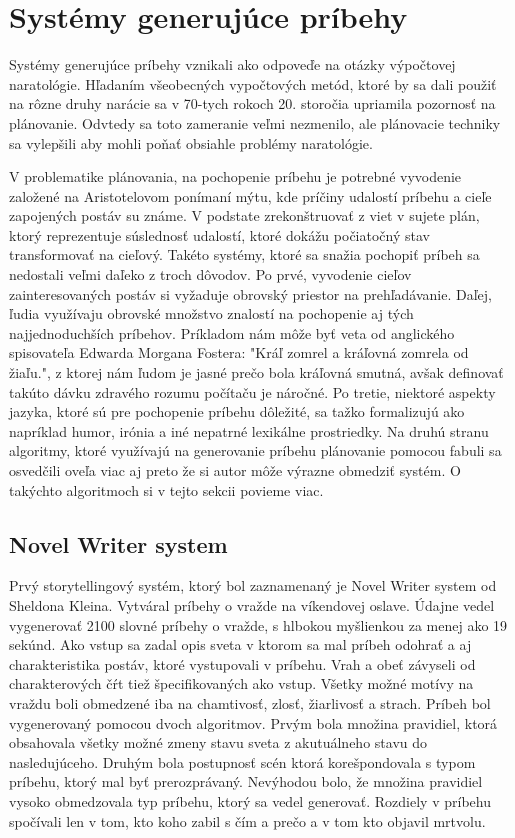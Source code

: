 \section{Systémy generujúce príbehy}
Systémy generujúce príbehy vznikali ako odpoveďe na otázky výpočtovej naratológie. Hľadaním všeobecných vypočtových metód, ktoré by sa dali použiť na rôzne druhy narácie sa v 70-tych rokoch 20. storočia upriamila pozornosť na plánovanie. Odvtedy sa toto zameranie veľmi nezmenilo, ale plánovacie techniky sa vylepšili aby mohli poňať obsiahle problémy naratológie.\par
V problematike plánovania, na pochopenie príbehu je potrebné vyvodenie založené na Aristotelovom ponímaní mýtu, kde príčiny udalostí príbehu a cieľe zapojených postáv su známe. V podstate zrekonštruovať z viet v sujete plán, ktorý reprezentuje súslednosť udalostí, ktoré dokážu počiatočný stav transformovať na cieľový. Takéto systémy, ktoré sa snažia pochopiť príbeh sa nedostali veľmi daľeko z troch dôvodov. Po prvé, vyvodenie cieľov zainteresovaných postáv si vyžaduje obrovský priestor na prehľadávanie. Daľej, ľudia využívaju obrovské množstvo znalostí na pochopenie aj tých najjednoduchších príbehov. Príkladom nám môže byť veta od anglického spisovateľa Edwarda Morgana Fostera: "Kráľ zomrel a kráľovná zomrela od žiaľu.", z ktorej nám ľudom je jasné prečo bola kráľovná smutná, avšak definovať takúto dávku zdravého rozumu počítaču je náročné. Po tretie, niektoré aspekty jazyka, ktoré sú pre pochopenie príbehu dôležité, sa tažko formalizujú ako napríklad humor, irónia a iné nepatrné lexikálne prostriedky. Na druhú stranu algoritmy, ktoré využívajú na generovanie príbehu plánovanie pomocou fabuli sa osvedčili oveľa viac aj preto že si autor môže výrazne obmedziť systém. O takýchto algoritmoch si v tejto sekcii povieme viac.\par
\subsection{Novel Writer system}
Prvý storytellingový systém, ktorý bol zaznamenaný je Novel Writer system\cite{novel_writer} od Sheldona Kleina. Vytváral príbehy o vražde na víkendovej oslave. Údajne vedel vygenerovať 2100 slovné príbehy o vražde, s hlbokou myšlienkou za menej ako 19 sekúnd. Ako vstup sa zadal opis sveta v ktorom sa mal príbeh odohrať a aj charakteristika postáv, ktoré vystupovali v príbehu. Vrah a obeť závyseli od charakterových čŕt tiež špecifikovaných ako vstup. Všetky možné motívy na vraždu boli obmedzené iba na chamtivosť, zlosť, žiarlivosť a strach. Príbeh bol vygenerovaný pomocou dvoch algoritmov. Prvým bola množina pravidiel, ktorá obsahovala všetky možné zmeny stavu sveta z akutuálneho stavu do nasledujúceho. Druhým bola postupnosť scén ktorá korešpondovala s typom príbehu, ktorý mal byť prerozprávaný. Nevýhodou bolo, že množina pravidiel vysoko obmedzovala typ príbehu, ktorý sa vedel generovať. Rozdiely v príbehu spočívali len v tom, kto koho zabil s čím a prečo a v tom kto objavil mrtvolu. \par
